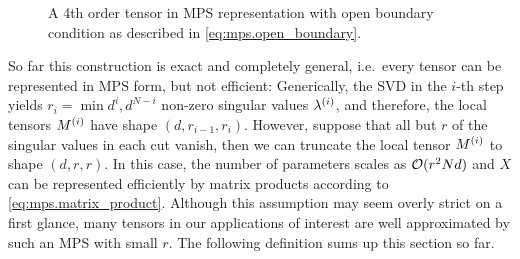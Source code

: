 \begin{figure*}
  \centering
  \caption{%
    \label{fig:mps.mps}
    A 4th order tensor in MPS representation with open boundary condition as described in \cref{eq:mps.open_boundary}.
  }
\end{figure*}

So far this construction is exact and completely general, i.e.\ every tensor can be represented in MPS form, but not efficient:
Generically, the SVD in the $i$-th step yields $r_i = \min{d^i, d^{N - i}}$ non-zero singular values $\lambda^{(i)}$, and therefore, the local tensors $M^{(i)}$ have shape $(d, r_{i-1}, r_i)$.
However, suppose that all but $r$ of the singular values in each cut vanish, then we can truncate the local tensor $M^{(i)}$ to shape $(d, r, r)$.
In this case, the number of parameters scales as ${\mathcal{O}}(r^2 N d)$ and $X$ can be represented efficiently by matrix products according to \cref{eq:mps.matrix_product}.
Although this assumption may seem overly strict on a first glance, many tensors in our applications of interest are well approximated by such an MPS with small $r$.
The following definition sums up this section so far.

